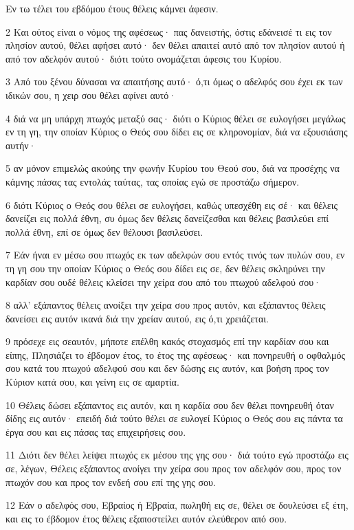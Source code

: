 \par Εν τω τέλει του εβδόμου έτους θέλεις κάμνει άφεσιν.
\par 2 Και ούτος είναι ο νόμος της αφέσεως· πας δανειστής, όστις εδάνεισέ τι εις τον πλησίον αυτού, θέλει αφήσει αυτό· δεν θέλει απαιτεί αυτό από τον πλησίον αυτού ή από τον αδελφόν αυτού· διότι τούτο ονομάζεται άφεσις του Κυρίου.
\par 3 Από του ξένου δύνασαι να απαιτήσης αυτό· ό,τι όμως ο αδελφός σου έχει εκ των ιδικών σου, η χειρ σου θέλει αφίνει αυτό·
\par 4 διά να μη υπάρχη πτωχός μεταξύ σας· διότι ο Κύριος θέλει σε ευλογήσει μεγάλως εν τη γη, την οποίαν Κύριος ο Θεός σου δίδει εις σε κληρονομίαν, διά να εξουσιάσης αυτήν·
\par 5 αν μόνον επιμελώς ακούης την φωνήν Κυρίου του Θεού σου, διά να προσέχης να κάμνης πάσας τας εντολάς ταύτας, τας οποίας εγώ σε προστάζω σήμερον.
\par 6 διότι Κύριος ο Θεός σου θέλει σε ευλογήσει, καθώς υπεσχέθη εις σέ· και θέλεις δανείζει εις πολλά έθνη, συ όμως δεν θέλεις δανείζεσθαι και θέλεις βασιλεύει επί πολλά έθνη, επί σε όμως δεν θέλουσι βασιλεύσει.
\par 7 Εάν ήναι εν μέσω σου πτωχός εκ των αδελφών σου εντός τινός των πυλών σου, εν τη γη σου την οποίαν Κύριος ο Θεός σου δίδει εις σε, δεν θέλεις σκληρύνει την καρδίαν σου ουδέ θέλεις κλείσει την χείρα σου από του πτωχού αδελφού σου·
\par 8 αλλ' εξάπαντος θέλεις ανοίξει την χείρα σου προς αυτόν, και εξάπαντος θέλεις δανείσει εις αυτόν ικανά διά την χρείαν αυτού, εις ό,τι χρειάζεται.
\par 9 πρόσεχε εις σεαυτόν, μήποτε επέλθη κακός στοχασμός επί την καρδίαν σου και είπης, Πλησιάζει το έβδομον έτος, το έτος της αφέσεως· και πονηρευθή ο οφθαλμός σου κατά του πτωχού αδελφού σου και δεν δώσης εις αυτόν, και βοήση προς τον Κύριον κατά σου, και γείνη εις σε αμαρτία.
\par 10 Θέλεις δώσει εξάπαντος εις αυτόν, και η καρδία σου δεν θέλει πονηρευθή όταν δίδης εις αυτόν· επειδή διά τούτο θέλει σε ευλογεί Κύριος ο Θεός σου εις πάντα τα έργα σου και εις πάσας τας επιχειρήσεις σου.
\par 11 Διότι δεν θέλει λείψει πτωχός εκ μέσου της γης σου· διά τούτο εγώ προστάζω εις σε, λέγων, Θέλεις εξάπαντος ανοίγει την χείρα σου προς τον αδελφόν σου, προς τον πτωχόν σου και προς τον ενδεή σου επί της γης σου.
\par 12 Εάν ο αδελφός σου, Εβραίος ή Εβραία, πωληθή εις σε, θέλει σε δουλεύσει εξ έτη, και εις το έβδομον έτος θέλεις εξαποστείλει αυτόν ελεύθερον από σου.
